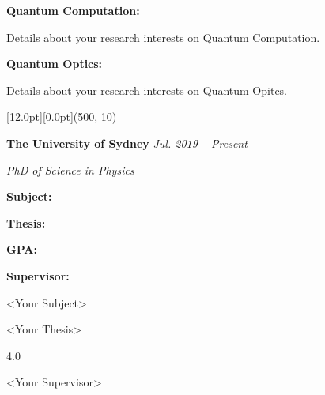 \documentclass[12pt,a4paper]{report}
\begin{document}
    \begin{center}
        \begin{minipage}[t]{460pt}
            {\textbf{Quantum Computation:}} \par
            \quad Details about your research interests on Quantum Computation. \par
            \vspace{4pt}\par
            {\textbf{Quantum Optics:}} \par
            \quad Details about your research interests on Quantum Opitcs. 
        \end{minipage} \par
    \end{center}
    \begin{center}\begin{minipage}[t]{512pt}
        \colorbox{subtitlecolor}{\raisebox{0pt}[12.0pt][0.0pt]{\makebox(500, 10){
            \textcolor{white}{\ttfamily{}\selectfont{}}}}}\end{minipage}\end{center}
    \begin{center}\begin{minipage}[t]{460pt}
        \textbf{The University of Sydney} \hfill{\em{Jul. 2019 -- Present}} \par
        \vspace{4pt}\quad\em{PhD of Science in Physics}
    \end{minipage}\end{center}
    \begin{center}
        \begin{minipage}[t]{120pt}
            \quad \textbf{Subject:} \par
            \quad \textbf{Thesis:} \par
            \quad \textbf{GPA:} \par
            \quad \textbf{Supervisor:} \par
        \end{minipage}
        \begin{minipage}[t]{340pt}
            \textless Your Subject\textgreater \par
            \textless Your Thesis\textgreater \par
            4.0 \par
            \textless Your Supervisor\textgreater  \par
        \end{minipage}
    \end{center}
\end{document}
